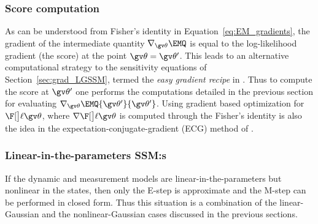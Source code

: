 \subsubsection{Score computation}\label{sec:fisheri}%

As can be understood from Fisher's identity in Equation~\eqref{eq:EM_gradients},
the gradient of the intermediate quantity $\nabla_{\Th}\EMQ$ is equal to the log-likelihood
gradient (the score) at the point $\Th=\Th'$. This leads to an alternative computational
strategy to the sensitivity equations of Section~\ref{sec:grad_LGSSM}, termed
the \emph{easy gradient recipe} in \textcite{Olsson2007}. Thus to compute the score
at $\Th'$ one performs the computations detailed in the previous section for evaluating
$\nabla_{\Th}\EMQ{\Th'}{\Th'}$. 
Using gradient based
optimization for $\lLH$, where
$\score$ is computed through the Fisher's identity 
is also the idea in the expectation-conjugate-gradient (ECG) method of \textcite{Salakhutdinov2003a}. 


\subsubsection*{Linear-in-the-parameters SSM:s}%
\label{sec:litp}

If the dynamic and measurement models are linear-in-the-parameters but nonlinear
in the states, then only the E-step is approximate and the M-step can be performed
in closed form. Thus this situation is a combination of the linear-Gaussian
and the nonlinear-Gaussian cases discussed in the previous sections.

